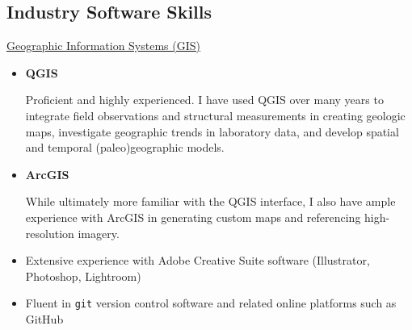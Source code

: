 \documentclass[10pt,a4paper,sans]{moderncv}
\begin{document}
\subsection{Industry Software Skills}
\underline{Geographic Information Systems (GIS)}
\vspace{-5pt}
\begin{multicols}{2}
 \begin{itemize}[itemsep=-3pt]
  \item \textbf{QGIS}\\
        \raggedright Proficient and highly experienced. I have
        used QGIS over many years to integrate field observations
        and structural measurements in creating geologic maps, investigate
        geographic trends in laboratory data, and develop spatial and temporal
        (paleo)geographic models.
        \columnbreak
  \item \textbf{ArcGIS}\\
        \raggedright While ultimately more familiar with the QGIS
        interface, I also have ample experience with ArcGIS in generating
        custom maps and referencing high-resolution imagery. %
 \end{itemize}
\end{multicols}
\vspace{-15pt}
\begin{itemize}[itemsep=-3pt]
 \item Extensive experience with Adobe Creative Suite software (Illustrator,
       Photoshop, Lightroom)
 \item Fluent in \texttt{git} version control software and
       related online platforms such as GitHub
\end{itemize}
\end{document}
